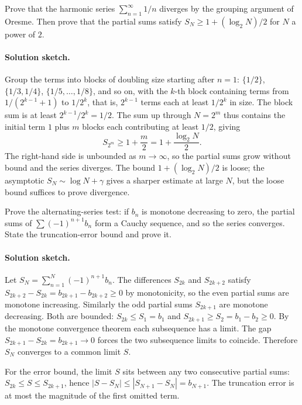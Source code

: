 \begin{exercise}
Prove that the harmonic series $\sum_{n=1}^{\infty} 1/n$ diverges by
the grouping argument of Oresme. Then prove that the partial sums
satisfy $S_{N} \geq 1 + (\log_{2} N)/2$ for $N$ a power of $2$.

\paragraph{Solution sketch.} Group the terms into blocks of doubling
size starting after $n = 1$: $\{1/2\}$, $\{1/3, 1/4\}$, $\{1/5, \ldots,
1/8\}$, and so on, with the $k$-th block containing terms from
$1/(2^{k-1} + 1)$ to $1/2^{k}$, that is, $2^{k-1}$ terms each at
least $1/2^{k}$ in size. The block sum is at least $2^{k-1}/2^{k} =
1/2$. The sum up through $N = 2^{m}$ thus contains the initial term
$1$ plus $m$ blocks each contributing at least $1/2$, giving
\[
S_{2^{m}} \geq 1 + \frac{m}{2} = 1 + \frac{\log_{2} N}{2}.
\]
The right-hand side is unbounded as $m \to \infty$, so the partial
sums grow without bound and the series diverges. The bound $1 +
(\log_{2} N)/2$ is loose; the asymptotic $S_{N} \sim \log N + \gamma$
gives a sharper estimate at large $N$, but the loose bound suffices
to prove divergence.
\end{exercise}

\begin{exercise}
Prove the alternating-series test: if $b_{n}$ is monotone decreasing
to zero, the partial sums of $\sum (-1)^{n+1} b_{n}$ form a Cauchy
sequence, and so the series converges. State the truncation-error
bound and prove it.

\paragraph{Solution sketch.} Let $S_{N} = \sum_{n=1}^{N} (-1)^{n+1}
b_{n}$. The differences $S_{2k}$ and $S_{2k+2}$ satisfy $S_{2k+2}
- S_{2k} = b_{2k+1} - b_{2k+2} \geq 0$ by monotonicity, so the even
partial sums are monotone increasing. Similarly the odd partial sums
$S_{2k+1}$ are monotone decreasing. Both are bounded: $S_{2k} \leq
S_{1} = b_{1}$ and $S_{2k+1} \geq S_{2} = b_{1} - b_{2} \geq 0$. By
the monotone convergence theorem each subsequence has a limit. The
gap $S_{2k+1} - S_{2k} = b_{2k+1} \to 0$ forces the two subsequence
limits to coincide. Therefore $S_{N}$ converges to a common limit
$S$.

For the error bound, the limit $S$ sits between any two consecutive
partial sums: $S_{2k} \leq S \leq S_{2k+1}$, hence $|S - S_{N}| \leq
|S_{N+1} - S_{N}| = b_{N+1}$. The truncation error is at most the
magnitude of the first omitted term.
\end{exercise}

